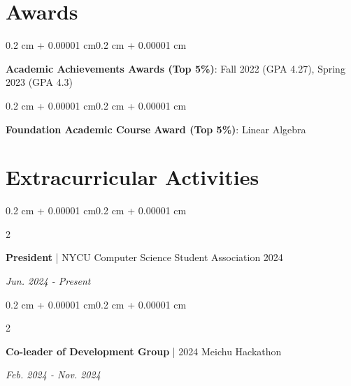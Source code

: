 \documentclass[10pt, letterpaper]{article}
\newenvironment{highlights}{
    \begin{itemize}[
        topsep=0.05 cm,
        parsep=0.05 cm,
        partopsep=0pt,
        itemsep=0pt,
        leftmargin=0.4 cm + 10pt
    ]
}{
    \end{itemize}
}
\newenvironment{onecolentry}{
    \begin{adjustwidth}{0.2 cm + 0.00001 cm}{0.2 cm + 0.00001 cm}
}{
    \end{adjustwidth}
}
\newenvironment{twocolentry}[2][]{
    \onecolentry
    \def\secondColumn{#2}
    \setcolumnwidth{\fill, 4.5 cm}
    \begin{paracol}{2}
}{
    \switchcolumn \raggedleft \secondColumn
    \end{paracol}
    \endonecolentry
}
\let\hrefWithoutArrow\href
\renewcommand{\href}[2]{\hrefWithoutArrow{#1}{\ifthenelse{\equal{#2}{}}{ }{#2 }\raisebox{.15ex}{\footnotesize \faExternalLink*}}}
\begin{document}
    \section{Awards}
        \begin{onecolentry}
            \textbf{Academic Achievements Awards (Top 5\%)}: Fall 2022 (GPA 4.27), Spring 2023 (GPA 4.3)
        \end{onecolentry}
        
        \vspace{0.15 cm}
        \begin{onecolentry}
            \textbf{Foundation Academic Course Award (Top 5\%)}: Linear Algebra
        \end{onecolentry}

    \section{Extracurricular Activities}

        \begin{twocolentry}{\textit{Jun. 2024 - Present}}
                \textbf{President} | NYCU Computer Science Student Association 2024
        \end{twocolentry}
        
        
        \vspace{0.15 cm}
        \begin{twocolentry}{\textit{Feb. 2024 - Nov. 2024}}
                \textbf{Co-leader of Development Group} | 2024 Meichu Hackathon
        \end{twocolentry}
    
\end{document}
